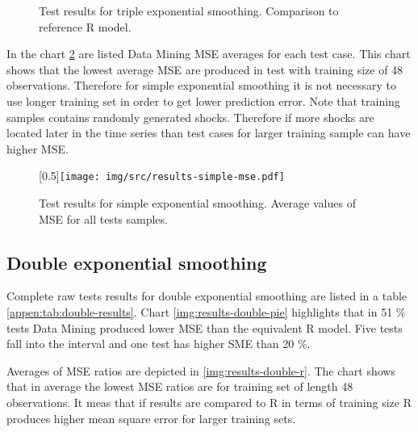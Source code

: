         \begin{figure}[H]
            \begin{center}
                \caption{Test results for triple exponential smoothing. Comparison to reference R model.}
                \label{img:results-simple-r}
            \end{center}
        \end{figure}

        In the chart \ref{img:results-simple-mse} are listed Data Mining MSE averages for each test case. This chart
        shows that the lowest average MSE are produced in test with training size of 48 observations. Therefore for
        simple exponential smoothing it is not necessary to use longer training set in order to get lower prediction
        error. Note that training samples contains randomly generated shocks. Therefore if more shocks are located later
        in the time series than test cases for larger training sample can have higher MSE.

        \begin{figure}[H]
            \begin{center}
                \scalebox{0.65}[0.5]{\texttt{[image: img/src/results-simple-mse.pdf]}}
                \caption{Test results for simple exponential smoothing. Average values of MSE for all tests samples.}
                \label{img:results-simple-mse}
            \end{center}
        \end{figure}

        \subsection{Double exponential smoothing} \label{sec:results-double}
        Complete raw tests results for double exponential smoothing are listed in a table
        \ref{appen:tab:double-results}. Chart \ref{img:results-double-pie} highlights that in 51 \% tests Data
        Mining produced lower MSE than the equivalent R model. Five tests fall into the interval
        \interval[{1.1,1.2}] and one test has higher SME than 20 \%.

        Averages of MSE ratios are depicted in \ref{img:results-double-r}. The chart shows that in average the lowest
        MSE ratios are for training set of length 48 observations. It meas that if results are compared to R in terms of
        training size R produces higher mean square error for larger training sets.

